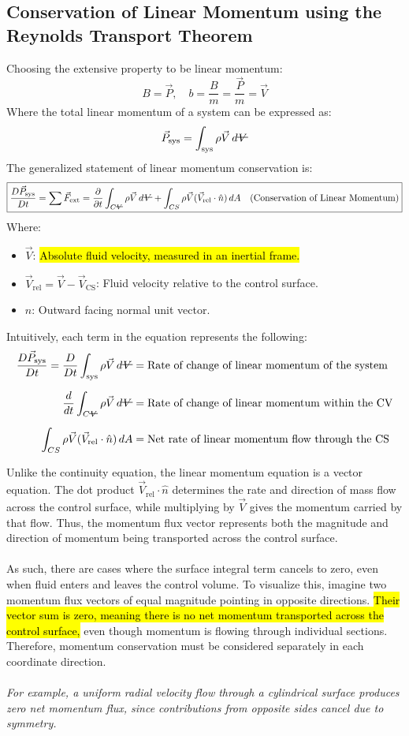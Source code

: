 ﻿\documentclass[12pt]{article}
\newcommand{\vol}{\mathord{\text{\ooalign{\hidewidth $V$\hidewidth\cr\kern-0.5pt\raisebox{0.8ex}{\rule[0pt]{1em}{0.5pt}}}}}}
\begin{document}
\subsection*{Conservation of Linear Momentum using the Reynolds Transport Theorem}
Choosing the extensive property to be linear momentum:
\[B=\vec{P},\quad b=\frac{B}{m}=\frac{\vec{P}}{m}=\vec{V}\]
Where the total linear momentum of a system can be expressed as:
\[\vec{P}_\text{sys} = \int_{\text{sys}} \rho \vec{V} \, d\vol\]
The generalized statement of linear momentum conservation is:
\[\boxed{\frac{D\vec{P}_\text{sys}}{Dt} = \sum \vec{F}_{\text{ext}} = \frac{\partial}{\partial t}\int_{C\vol} \rho \vec{V} \, d\vol + \int_{CS} \rho \vec{V} (\vec{V}_{\text{rel}}\cdot \hat{n}) \, dA\quad \text{(Conservation of Linear Momentum)}}\]
Where:
\begin{itemize}
    \item $\vec{V}$: \hl{Absolute fluid velocity, measured in an inertial frame.}
    \item $\vec{V}_{\mathrm{rel}} = \vec{V} - \vec{V}_{\mathrm{CS}}$: Fluid velocity relative to the control surface.
    \item $\hat{n}$: Outward facing normal unit vector.
\end{itemize}
Intuitively, each term in the equation represents the following:
\[
\begin{aligned}
\frac{D\vec{P}_\text{sys}}{Dt} = \frac{D}{Dt}\int_{\mathrm{sys}}\rho\vec{V}\,d\vol
&= \text{Rate of change of linear momentum of the system}\\[6pt]
\frac{d}{dt}\int_{C\vol}\rho\vec{V}\,d\vol
&= \text{Rate of change of linear momentum within the CV}\\[6pt]
\int_{CS}\rho\vec{V}(\vec{V}_{\mathrm{rel}}\cdot\hat{n})\,dA
&= \text{Net rate of linear momentum flow through the CS}
\end{aligned}
\]
\begin{notebox}
    Unlike the continuity equation, the linear momentum equation is a vector equation. The dot product $\vec{V}_{\mathrm{rel}}\cdot\hat{n}$ determines the rate and direction of mass flow across the control surface, while multiplying by $\vec{V}$ gives the momentum carried by that flow. Thus, the momentum flux vector represents both the magnitude and direction of momentum being transported across the control surface.\\\\
    As such, there are cases where the surface integral term cancels to zero, even when fluid enters and leaves the control volume. To visualize this, imagine two momentum flux vectors of equal magnitude pointing in opposite directions. \hl{Their vector sum is zero, meaning there is no net momentum transported across the control surface,} even though momentum is flowing through individual sections. Therefore, momentum conservation must be considered separately in each coordinate direction.\\\\
    \textit{For example, a uniform radial velocity flow through a cylindrical surface produces zero net momentum flux, since contributions from opposite sides cancel due to symmetry.}
\end{notebox}
\end{document}
